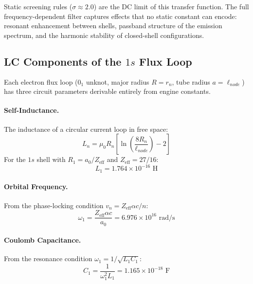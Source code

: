 Static screening rules ($\sigma \approx 2.0$) are the DC limit of this transfer function. The full frequency-dependent filter captures effects that no static constant can encode: resonant enhancement between shells, passband structure of the emission spectrum, and the harmonic stability of closed-shell configurations.

\subsection{LC Components of the $1s$ Flux Loop}

Each electron flux loop ($0_1$ unknot, major radius $R = r_n$, tube radius $a = \ell_{node}$) has three circuit parameters derivable entirely from engine constants.

\paragraph{Self-Inductance.} The inductance of a circular current loop in free space:
\begin{equation}
    L_n = \mu_0 R_n \left[\ln\!\left(\frac{8R_n}{\ell_{node}}\right) - 2\right]
\end{equation}
For the $1s$ shell with $R_1 = a_0/Z_\text{eff}$ and $Z_\text{eff} = 27/16$:
\begin{equation}
    L_1 = 1.764 \times 10^{-16} \text{ H}
\end{equation}

\paragraph{Orbital Frequency.} From the phase-locking condition $v_n = Z_\text{eff} \alpha c / n$:
\begin{equation}
    \omega_1 = \frac{Z_\text{eff} \alpha c}{a_0} = 6.976 \times 10^{16} \text{ rad/s}
\end{equation}

\paragraph{Coulomb Capacitance.} From the resonance condition $\omega_1 = 1/\sqrt{L_1 C_1}$:
\begin{equation}
    C_1 = \frac{1}{\omega_1^2 L_1} = 1.165 \times 10^{-18} \text{ F}
\end{equation}


